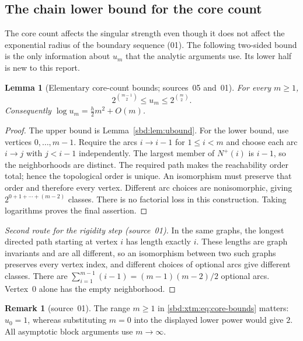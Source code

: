 \documentclass[11pt,a4paper]{article}
\newtheorem{lemma}[theorem]{Lemma}
\theoremstyle{definition}
\newtheorem{remark}[theorem]{Remark}
\begin{document}
\subsection{The chain lower bound for the core count}
The core count affects the singular strength even though it does not affect
the exponential radius of the boundary sequence (01). The following
two-sided bound is the only information about $u_m$ that the analytic
arguments use. Its lower half is new to this report.

\begin{lemma}[Elementary core-count bounds; sources~05 and~01]\label{sbd:xtm:lem:core-bounds}
For every $m\ge1$,
\begin{equation}\label{sbd:xtm:eq:core-bounds}
 2^{\binom{m-1}{2}}\le u_m\le2^{\binom m2}.
\end{equation}
Consequently $\log u_m=\tfrac h2m^2+O(m)$.
\end{lemma}
\begin{proof}
The upper bound is Lemma~\ref{sbd:lem:ubound}. For the lower bound, use
vertices $0,\ldots,m-1$. Require the arcs $i\to i-1$ for $1\le i<m$ and
choose each arc $i\to j$ with $j<i-1$ independently. The largest member of
$N^+(i)$ is $i-1$, so the neighborhoods are distinct. The required path
makes the reachability order total; hence the topological order is unique.
An isomorphism must preserve that order and therefore every vertex.
Different arc choices are nonisomorphic, giving $2^{0+1+\cdots+(m-2)}$
classes. There is no factorial loss in this construction. Taking
logarithms proves the final assertion.
\end{proof}

\begin{proof}[Second route for the rigidity step (source~01)]
In the same graphs, the longest directed path starting at vertex $i$ has
length exactly $i$. These lengths are graph invariants and are all
different, so an isomorphism between two such graphs preserves every
vertex index, and different choices of optional arcs give different
classes. There are $\sum_{i=1}^{m-1}(i-1)=(m-1)(m-2)/2$ optional arcs.
Vertex~$0$ alone has the empty neighborhood.
\end{proof}

\begin{remark}[source~01]\label{sbd:edge:rem:m0}
The range $m\ge1$ in \eqref{sbd:xtm:eq:core-bounds} matters: $u_0=1$,
whereas substituting $m=0$ into the displayed lower power would give $2$.
All asymptotic block arguments use $m\to\infty$.
\end{remark}
\end{document}
